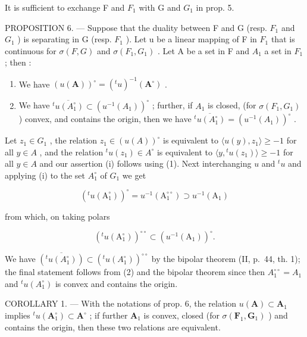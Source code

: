 It is sufficient to exchange F and \(F_{1}\) with G and \(G_{1}\) in prop. 5.

PROPOSITION 6. --- Suppose that the duality between F and G (resp. \(F_{1}\) and \(G_{1}\) ) is separating in G (resp. \(F_{1}\) ). Let u be a linear mapping of F in \(F_{1}\) that is continuous for \(\sigma(F, G)\) and \(\sigma(F_{1}, G_{1})\) . Let A be a set in F and \(A_{1}\) a set in \(F_{1}\) ; then :

\begin{enumerate}
\def\labelenumi{(\roman{enumi})}
\item
  We have \((u(\mathbf{A}))^{\circ} = ({}^{t} u)^{-1} (\mathbf{A}^{\circ})\) .
\item
  We have \(\overline{{}^{t}u(A_1^\circ)}\subset (u^{-1}(A_1))^{\circ}\) ; further, if \(A_1\) is closed, (for \(\sigma(F_1,G_1)\) ) convex, and contains the origin, then we have \(\overline{{}^{t}u(A_1^\circ)} = (u^{-1}(A_1))^{\circ}\) .
\end{enumerate}

Let \(z_{1} \in G_{1}\) , the relation \(z_{1} \in (u(A))^{\circ}\) is equivalent to \(\langle u(y), z_{1} \rangle \geqslant -1\) for all \(y \in A\) , and the relation \({}^{t}u(z_{1}) \in A^{\circ}\) is equivalent to \(\langle y, {}^{t}u(z_{1}) \rangle \geqslant -1\) for all \(y \in A\) and our assertion (i) follows using (1). Next interchanging \(u\) and \({}^{t}u\) and applying (i) to the set \(A_{1}^{\circ}\) of \(G_{1}\) we get

\[
\left(^ {t} u \left(\mathrm{A} _ {1} ^ {\circ}\right)\right) ^ {\circ} = u ^ {- 1} \left(\mathrm{A} _ {1} ^ {\circ \circ}\right) \supset u ^ {- 1} \left(\mathrm{A} _ {1}\right)\tag{2}
\]

from which, on taking polars

\[
\left(^ {t} u \left(\mathrm{A} _ {1} ^ {\circ}\right)\right) ^ {\circ \circ} \subset \left(u ^ {- 1} \left(\mathrm{A} _ {1}\right)\right) ^ {\circ}.
\]

We have \(\overline{(^t u(A_1^\circ))} \subset (^{t}u(A_1^\circ))^{\circ \circ}\) by the bipolar theorem (II, p.~44, th. 1); the final statement follows from (2) and the bipolar theorem since then \(A_1^{\circ \circ} = A_1\) and \(^t u(A_1^\circ)\) is convex and contains the origin.

COROLLARY 1. --- With the notations of prop. 6, the relation \(u(\mathbf{A}) \subset \mathbf{A}_1\) implies \(^t u(\mathbf{A}_1^\circ) \subset \mathbf{A}^\circ\) ; if further \(\mathbf{A}_1\) is convex, closed (for \(\sigma(\mathbf{F}_1, \mathbf{G}_1)\) ) and contains the origin, then these two relations are equivalent.

